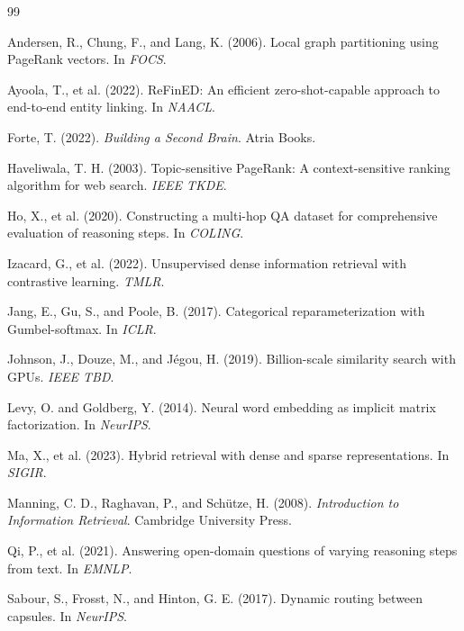 \documentclass[11pt,a4paper]{article}
\begin{document}

\begin{thebibliography}{99}

Andersen, R., Chung, F., and Lang, K. (2006).
Local graph partitioning using PageRank vectors.
In \textit{FOCS}.

Ayoola, T., et al. (2022).
ReFinED: An efficient zero-shot-capable approach to end-to-end entity linking.
In \textit{NAACL}.

Forte, T. (2022).
\textit{Building a Second Brain}.
Atria Books.

Haveliwala, T. H. (2003).
Topic-sensitive PageRank: A context-sensitive ranking algorithm for web search.
\textit{IEEE TKDE}.

Ho, X., et al. (2020).
Constructing a multi-hop QA dataset for comprehensive evaluation of reasoning steps.
In \textit{COLING}.

Izacard, G., et al. (2022).
Unsupervised dense information retrieval with contrastive learning.
\textit{TMLR}.

Jang, E., Gu, S., and Poole, B. (2017).
Categorical reparameterization with Gumbel-softmax.
In \textit{ICLR}.

Johnson, J., Douze, M., and Jégou, H. (2019).
Billion-scale similarity search with GPUs.
\textit{IEEE TBD}.

Levy, O. and Goldberg, Y. (2014).
Neural word embedding as implicit matrix factorization.
In \textit{NeurIPS}.

Ma, X., et al. (2023).
Hybrid retrieval with dense and sparse representations.
In \textit{SIGIR}.

Manning, C. D., Raghavan, P., and Schütze, H. (2008).
\textit{Introduction to Information Retrieval}.
Cambridge University Press.

Qi, P., et al. (2021).
Answering open-domain questions of varying reasoning steps from text.
In \textit{EMNLP}.

Sabour, S., Frosst, N., and Hinton, G. E. (2017).
Dynamic routing between capsules.
In \textit{NeurIPS}.


\end{thebibliography}
\end{document}
